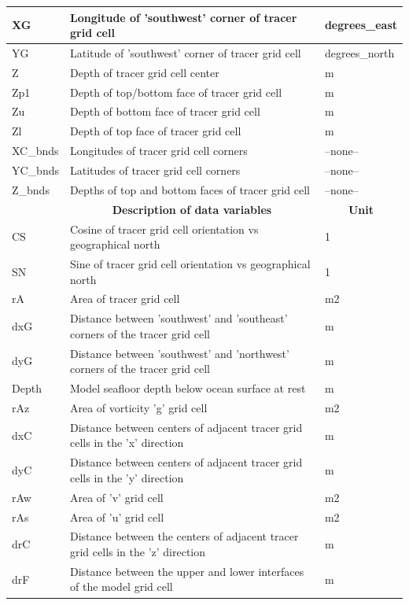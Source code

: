 \begin{longtable}{|m{}|m{}|m{}|}
XG &Longitude of 'southwest' corner of tracer grid cell &degrees\_east  \\ \hline
YG &Latitude of 'southwest' corner of tracer grid cell &degrees\_north  \\ \hline
Z &Depth of tracer grid cell center &m  \\ \hline
Zp1 &Depth of top/bottom face of tracer grid cell &m  \\ \hline
Zu &Depth of bottom face of tracer grid cell &m  \\ \hline
Zl &Depth of top face of tracer grid cell &m  \\ \hline
XC\_bnds &Longitudes of tracer grid cell corners &--none--  \\ \hline
YC\_bnds &Latitudes of tracer grid cell corners &--none--  \\ \hline
Z\_bnds &Depths of top and bottom faces of tracer grid cell &--none--  \\ \hline
\rowcolor{lightgray} \multicolumn{1}{|c|}{\textbf{Variables}} & \multicolumn{1}{|c|}{\textbf{Description of data variables}} &  \multicolumn{1}{|c|}{\textbf{Unit}}\\ \hline
CS &Cosine of tracer grid cell orientation vs geographical north &1  \\ \hline
SN &Sine of tracer grid cell orientation vs geographical north &1  \\ \hline
rA &Area of tracer grid cell &m2  \\ \hline
dxG &Distance between 'southwest' and 'southeast' corners of the tracer grid cell &m  \\ \hline
dyG &Distance between 'southwest' and 'northwest' corners of the tracer grid cell &m  \\ \hline
Depth &Model seafloor depth below ocean surface at rest &m  \\ \hline
rAz &Area of vorticity 'g' grid cell &m2  \\ \hline
dxC &Distance between centers of adjacent tracer grid cells in the 'x' direction &m  \\ \hline
dyC &Distance between centers of adjacent tracer grid cells in the 'y' direction &m  \\ \hline
rAw &Area of 'v' grid cell &m2  \\ \hline
rAs &Area of 'u' grid cell &m2  \\ \hline
drC &Distance between the centers of adjacent tracer grid cells in the 'z' direction &m  \\ \hline
drF &Distance between the upper and lower interfaces of the model grid cell &m  \\ \hline

\end{longtable}
